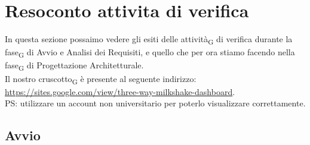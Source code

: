 
\section{Resoconto {attivita} di verifica}
In questa sezione possaimo vedere gli esiti delle attività\textsubscript{G} di verifica durante la fase\textsubscript{G} di Avvio e Analisi dei Requisiti, e quello che per ora stiamo facendo nella fase\textsubscript{G} di Progettazione Architetturale.\\
Il nostro cruscotto\textsubscript{G} è presente al seguente indirizzo:\\ \url{https://sites.google.com/view/three-way-milkshake-dashboard}.\\PS: utilizzare un account non universitario per poterlo visualizzare correttamente.
\subsection{Avvio}
